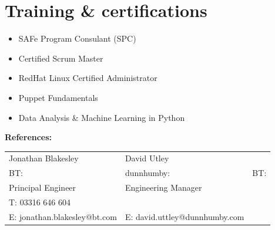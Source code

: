 \documentclass[]{cv-style}          %
\begin{document}
\section{Training \& certifications}
  \vspace{-0.2cm}
\begin{itemize}
  \item{SAFe Program Consulant (SPC)}
  \item{Certified Scrum Master}
  \item{RedHat Linux Certified Administrator}
  \item{Puppet Fundamentals}
  \item{Data Analysis \& Machine Learning in Python}
\end{itemize}



\textbf{References:}\\
\begin{center}
  \begin{tabular}{ |l|l|l| }
    \hline
    Jonathan Blakesley & David Utley\\
    BT: & dunnhumby: & BT: \\
    Principal Engineer & Engineering Manager\\
    T: 03316 646 604 &  &  \\
    E: jonathan.blakesley@bt.com & E: david.uttley@dunnhumby.com\\
    \hline
  \end{tabular}
\end{center}
\end{document}
